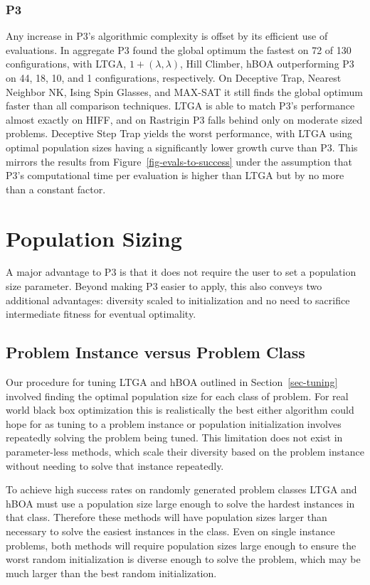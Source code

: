 \documentclass[twoside]{article}
\begin{document}
\subsubsection{P3}
Any increase in P3's algorithmic complexity is offset by its efficient use of evaluations.
In aggregate P3 found the global optimum the fastest on 72 of 130 configurations,
with LTGA, $1+(\lambda, \lambda)$, Hill Climber, hBOA outperforming P3 on 44, 18, 10, and 1 configurations, respectively.
On
Deceptive Trap, Nearest Neighbor NK, Ising Spin Glasses, and MAX-SAT it still finds the global
optimum faster than all comparison techniques. LTGA is able to match P3's performance almost exactly on HIFF,
and on Rastrigin P3 falls behind only on moderate sized problems. Deceptive Step Trap yields the worst performance,
with LTGA using optimal population sizes having a significantly lower growth curve than P3. This mirrors
the results from Figure~\ref{fig-evals-to-success} under the assumption that P3's computational time per evaluation is higher
than LTGA but by no more than a constant factor.

\section{Population Sizing}
A major advantage to P3 is that it does not require the user to set a population size parameter.
Beyond making P3 easier to apply, this also conveys two additional advantages: diversity scaled
to initialization and no need to sacrifice intermediate fitness for eventual optimality.

\subsection{Problem Instance versus Problem Class}
Our procedure for tuning LTGA and hBOA outlined in Section~\ref{sec-tuning} involved finding
the optimal population size for each class of problem. For real world black box optimization this is
realistically the best either algorithm could hope for as tuning to a problem
instance or population initialization involves repeatedly solving the problem being tuned.
This limitation does not exist in parameter-less methods, which scale their diversity
based on the problem instance without needing to solve that instance repeatedly.

To achieve high success rates on randomly generated problem classes LTGA and hBOA must use a population size
large enough to solve the hardest instances in that class. Therefore these methods will have
population sizes larger than necessary to solve the easiest instances in the class. Even
on single instance problems, both methods will require population sizes large enough to
ensure the worst random initialization is diverse enough to solve the problem, which may be
much larger than the best random initialization.
\end{document}
